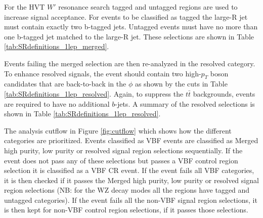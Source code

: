 For the HVT $W'$ resonance search tagged and untagged regions are used to increase signal acceptance. For events to be classified as tagged the large-R jet must contain exactly two b-tagged jets. Untagged events must have no more than one b-tagged jet matched to the large-R jet. These selections are shown in Table \ref{tab:SRdefinitions_1lep_merged}. 

Events failing the merged selection are then re-analyzed in the resolved category. To enhance resolved signals, the event should contain two high-$p_{T}$ boson candidates that are back-to-back in the $\phi$ as shown by the cuts in Table \ref{tab:SRdefinitions_1lep_resolved}. Again, to suppress the $t\bar{t}$ backgrounds, events are required to have no additional $b$-jets. A summary of the resolved selections is shown in Table \ref{tab:SRdefinitions_1lep_resolved}.

The analysis cutflow in Figure \ref{fig:cutflow} which shows how the different categories are prioritized. Events classified as VBF events are classified as Merged high purity, low purity or resolved signal region selections sequentially. If the event does not pass any of these selections but passes a VBF control region selection it is classified as a VBF CR event. 
If the event fails all VBF categories, it is then checked if it passes the Merged high purity, low purity or resolved signal region selections (NB: for the WZ decay modes all the regions have tagged and untagged categories). If the event fails all the non-VBF signal region selections, it is then kept for non-VBF control region selections, if it passes those selections. 


